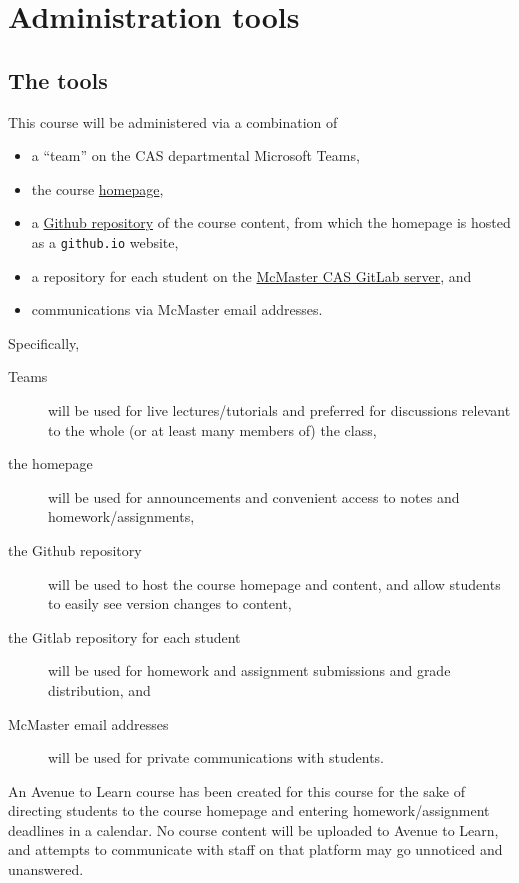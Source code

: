 \documentclass[11pt]{article}
\begin{document}
\section{Administration tools}
\label{sec:orga2b39ca}
\subsection{The tools}
\label{sec:orgba067d3}
This course will be administered via a combination of
\begin{itemize}
\item a “team” on the CAS departmental Microsoft Teams,
\item the course
\href{https://armkeh.github.io/principles-of-programming-languages/}{homepage},
\item a \href{https://github.com/armkeh/principles-of-programming-languages}{Github repository}
of the course content, from which
the homepage is hosted as a \texttt{github.io} website,
\item a repository for each student on the
\href{https://gitlab.cas.mcmaster.ca}{McMaster CAS GitLab server}, and
\item communications via McMaster email addresses.
\end{itemize}

Specifically,
\begin{description}
\item[{Teams}] will be used for live lectures/tutorials
and preferred for discussions relevant to the whole
(or at least many members of) the class,
\item[{the homepage}] will be used for announcements
and convenient access to notes and homework/assignments,
\item[{the Github repository}] will be used to host the course homepage
and content, and allow students to easily see version changes
to content,
\item[{the Gitlab repository for each student}] will be used
for homework and assignment submissions and grade distribution, and
\item[{McMaster email addresses}] will be used
for private communications with students.
\end{description}

An Avenue to Learn course has been created for this course
for the sake of directing students to the course homepage
and entering homework/assignment deadlines in a calendar.
No course content will be uploaded to Avenue to Learn,
and attempts to communicate with staff on that platform
may go unnoticed and unanswered.
\end{document}
